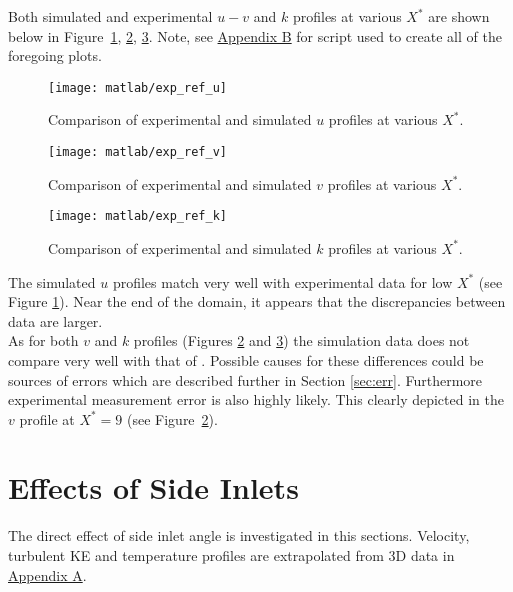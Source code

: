 Both simulated and experimental $u-v$ and $k$ profiles at various $X^*$ are shown below in Figure~\ref{fig:exp_ref_u}, \ref{fig:exp_ref_v}, \ref{fig:exp_ref_k}. Note, see \hyperlink{appendixb}{Appendix B} for \cite{matlab} script used to create all of the foregoing plots.\\
\begin{figure}[H]
	\centering
	\texttt{[image: matlab/exp\_ref\_u]}
	\caption{Comparison of experimental and simulated $u$ profiles at various $X^*$.}
	\label{fig:exp_ref_u}
\end{figure}

\begin{figure}[H]
	\centering
	\texttt{[image: matlab/exp\_ref\_v]}
	\caption{Comparison of experimental and simulated $v$ profiles at various $X^*$.}
	\label{fig:exp_ref_v}
\end{figure}

\begin{figure}[H]
	\centering
	\texttt{[image: matlab/exp\_ref\_k]}
	\caption{Comparison of experimental and simulated $k$ profiles at various $X^*$.}
	\label{fig:exp_ref_k}
\end{figure}

The simulated $u$ profiles match very well with experimental data for low $X^*$ (see Figure  \ref{fig:exp_ref_u}). Near the end of the domain, it appears that the discrepancies between data are larger.\\

As for both $v$ and $k$ profiles (Figures \ref{fig:exp_ref_v} and \ref{fig:exp_ref_k}) the simulation data does not compare very well with that of \cite{art}. Possible causes for these differences could be sources of errors which are described further in Section \ref{sec:err}. Furthermore experimental measurement error is also highly likely. This clearly depicted in the $v$ profile at $X^*=9$ (see Figure~\ref{fig:exp_ref_v}).
\section{Effects of Side Inlets}
\label{sec:effects_side}
The direct effect of side inlet angle is investigated in this sections. Velocity, turbulent KE and temperature profiles are extrapolated from 3D data in \hyperlink{appendixa}{Appendix A}.\\

